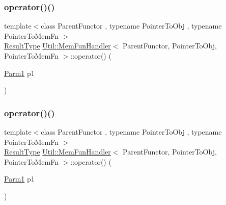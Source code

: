 \mbox{\label{classUtil_1_1MemFunHandler_a5d20125065c3cc89ca77c0c546923523}} 
\subsubsection{\texorpdfstring{operator()()}{operator()()}\hspace{0.1cm}{\footnotesize\ttfamily [4/18]}}
{\footnotesize\ttfamily template$<$class Parent\+Functor , typename Pointer\+To\+Obj , typename Pointer\+To\+Mem\+Fn $>$ \\
\mbox{\hyperlink{classUtil_1_1MemFunHandler_a093690dcced95ad48c5429e50006c83e}{Result\+Type}} \mbox{\hyperlink{classUtil_1_1MemFunHandler}{Util\+::\+Mem\+Fun\+Handler}}$<$ Parent\+Functor, Pointer\+To\+Obj, Pointer\+To\+Mem\+Fn $>$\+::operator() (\begin{DoxyParamCaption}\item[{\mbox{\hyperlink{classUtil_1_1MemFunHandler_a43182733677fc623d89e5613ecf15761}{Parm1}}}]{p1 }\end{DoxyParamCaption})\hspace{0.3cm}{\ttfamily [inline]}}

\mbox{\label{classUtil_1_1MemFunHandler_a5d20125065c3cc89ca77c0c546923523}} 
\subsubsection{\texorpdfstring{operator()()}{operator()()}\hspace{0.1cm}{\footnotesize\ttfamily [5/18]}}
{\footnotesize\ttfamily template$<$class Parent\+Functor , typename Pointer\+To\+Obj , typename Pointer\+To\+Mem\+Fn $>$ \\
\mbox{\hyperlink{classUtil_1_1MemFunHandler_a093690dcced95ad48c5429e50006c83e}{Result\+Type}} \mbox{\hyperlink{classUtil_1_1MemFunHandler}{Util\+::\+Mem\+Fun\+Handler}}$<$ Parent\+Functor, Pointer\+To\+Obj, Pointer\+To\+Mem\+Fn $>$\+::operator() (\begin{DoxyParamCaption}\item[{\mbox{\hyperlink{classUtil_1_1MemFunHandler_a43182733677fc623d89e5613ecf15761}{Parm1}}}]{p1 }\end{DoxyParamCaption})\hspace{0.3cm}{\ttfamily [inline]}}

